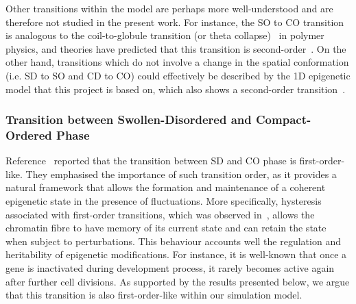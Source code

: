 \documentclass[12pt]{article}
\begin{document}
Other transitions within the model are perhaps more well-understood and are therefore not studied in the present work. For instance, the SO to CO transition is analogous to the coil-to-globule transition (or theta collapse)~\cite{polymerbook} in polymer physics, and theories have predicted that this transition is second-order~\cite{moore1977, sanchez1979}. On the other hand, transitions which do not involve a change in the spatial conformation (i.e. SD to SO and CD to CO) could effectively be described by the 1D epigenetic model that this project is based on, which also shows a second-order transition~\cite{dodd2007}.

\subsubsection{Transition between Swollen-Disordered and Compact-Ordered Phase}
Reference~\cite{michieletto2016} reported that the transition between SD and CO phase is first-order-like. They emphasised the importance of such transition order, as it provides a natural framework that allows the formation and maintenance of a coherent epigenetic state in the presence of fluctuations. More specifically, hysteresis associated with first-order transitions, which was observed in~\cite{michieletto2016},  allows the chromatin fibre to have memory of its current state and can retain the state when subject to perturbations. This behaviour accounts well the regulation and heritability of epigenetic modifications. For instance, it is well-known that once a gene is inactivated during development process, it rarely becomes active again after further cell divisions. As supported by the results presented below, we argue that this transition is also first-order-like within our simulation model.
\end{document}
